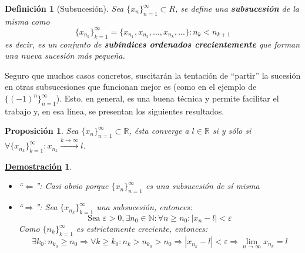 \documentclass[10pt,a4paper,openright]{book}
\theoremstyle{break}
\newtheorem{defi}{Definición}[chapter]
\newtheorem{prop}{Proposición}[chapter]
\newtheorem*{demo}{\underline{Demostración}}
\begin{document}
\begin{defi}[Subsucesión]
Sea $\{x_n\}_{n=1}^\infty\subset R$, se define una \textbf{subsucesión} de la misma como
\[
\{x_{n_k}\}_{k=1}^\infty=\{x_{n_1}, x_{n_2}, ..., x_{n_k}, ...\}: n_k<n_{k+1}
\]
es decir, es un conjunto de \textbf{subíndices ordenados crecientemente} que forman una nueva sucesión más pequeña.
\end{defi}

Seguro que muchos casos concretos, suscitarán la tentación de ``partir'' la sucesión en otras subsucesiones que funcionan mejor es (como en el ejemplo de $\{(-1)^n\}_{n=1}^\infty$). Esto, en general, es una buena técnica y permite facilitar el trabajo y, en esa línea, se presentan los siguientes resultados.

\begin{prop}
Sea $\{x_n\}_{n=1}^\infty\subset \mathbb R$, ésta converge a $l\in \mathbb R$ si y sólo si $\forall \{x_{n_k}\}_{k=1}^\infty : x_{n_k}\xrightarrow{k\rightarrow \infty} l$.
\end{prop}
\begin{demo}
\begin{itemize}
\item ``$\Leftarrow$'':
	Casi obvio porque $\{x_n\}_{n=1}^\infty$ es una subsucesión de sí misma
	
\item ``$\Rightarrow$'':
	Sea $\{x_{n_k}\}_{k=1}^\infty$ una subsucesión, entonces:
	$$\mbox{Sea }\varepsilon>0, \exists n_0\in \mathbb N: \forall n\geq n_0: \left|x_n-l\right|<\varepsilon$$
	Como $\{n_k\}_{k=1}^\infty$ es estrictamente creciente, entonces:
	$$\exists k_0: n_{k_0}\geq n_0\Rightarrow \forall k\geq k_0: n_k>n_{k_0}>n_0\Rightarrow \left|x_{n_k}-l\right|<\varepsilon\Rightarrow \lim_{n\rightarrow \infty} x_{n_k}=l$$
\end{itemize}
\end{demo}
\end{document}
